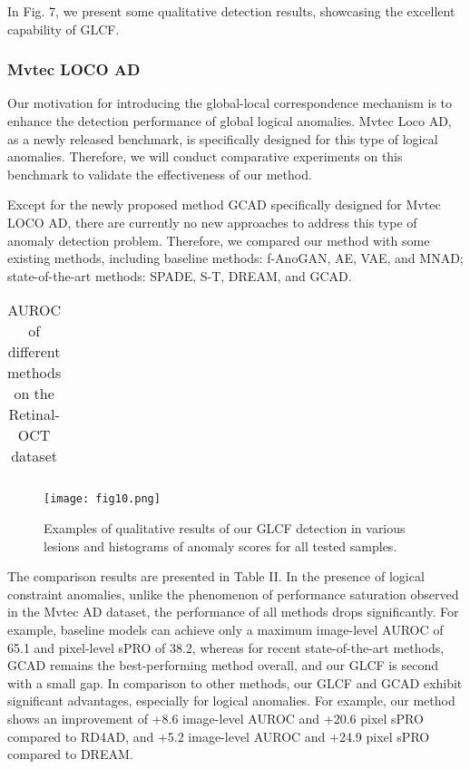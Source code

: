 \documentclass[lettersize,journal]{IEEEtran}
\begin{document}
In Fig. 7, we present some qualitative detection results, showcasing the excellent capability of GLCF.

\subsubsection{\textbf{Mvtec LOCO AD}}

Our motivation for introducing the global-local correspondence mechanism is to enhance the detection performance of global logical anomalies. Mvtec Loco AD, as a newly released benchmark, is specifically designed for this type of logical anomalies. Therefore, we will conduct comparative experiments on this benchmark to validate the effectiveness of our method.


Except for the newly proposed method GCAD\cite{r31} specifically designed for Mvtec LOCO AD, there are currently no new approaches to address this type of anomaly detection problem. Therefore, we compared our method with some existing methods, including baseline methods: f-AnoGAN\cite{r36}, AE\cite{r2}, VAE\cite{r37}, and MNAD\cite{r38}; state-of-the-art methods: SPADE\cite{r21}, S-T\cite{r12}, DREAM\cite{r20}, and GCAD\cite{r31}.
\begin{table}
\caption{AUROC of different methods on the Retinal-OCT dataset}
\label{table}
\setlength{\tabcolsep}{3pt}
\begin{threeparttable}
\begin{tabular}{p{8.8cm}}

\end{tabular}
\end{threeparttable}
\label{table4}
\end{table}

 \begin{figure}[t]\centering
\texttt{[image: fig10.png]}
\caption{Examples of qualitative results of our GLCF detection in various lesions and histograms of anomaly scores for all tested samples.}
\label{FIG0}
\end{figure}
The comparison results are presented in Table II. In the presence of logical constraint anomalies, unlike the phenomenon of performance saturation observed in the Mvtec AD dataset, the performance of all methods drops significantly. For example, baseline models can achieve only a maximum image-level AUROC of 65.1 and pixel-level sPRO of 38.2, whereas for recent state-of-the-art methods, GCAD remains the best-performing method overall, and our GLCF is second with a small gap. In comparison to other methods, our GLCF and GCAD exhibit significant advantages, especially for logical anomalies. For example, our method shows an improvement of +8.6 image-level AUROC and +20.6 pixel sPRO compared to RD4AD, and +5.2 image-level AUROC and +24.9 pixel sPRO compared to DREAM.
\end{document}
